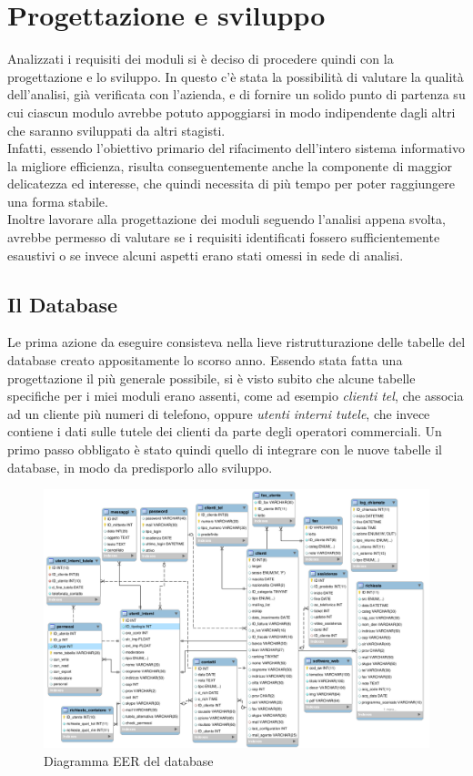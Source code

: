 \section{Progettazione e sviluppo}
Analizzati i requisiti dei moduli si \`e deciso di procedere quindi con la progettazione e lo sviluppo. In questo c'\`e stata la possibilit\`a di valutare la qualit\`a dell'analisi, gi\`a verificata con l'azienda, e di fornire un solido punto di partenza su cui ciascun modulo avrebbe potuto appoggiarsi in modo indipendente dagli altri che saranno sviluppati da altri stagisti. \\
Infatti, essendo l'obiettivo primario del rifacimento dell'intero sistema informativo la migliore efficienza, risulta conseguentemente anche la componente di maggior delicatezza ed interesse, che quindi necessita di pi\`u tempo per poter raggiungere una forma stabile. \\
Inoltre lavorare alla progettazione dei moduli seguendo l'analisi appena svolta, avrebbe permesso di valutare se i requisiti identificati fossero sufficientemente esaustivi o se invece alcuni aspetti erano stati omessi in sede di analisi.

\newpage
\subsection{Il Database}
Le prima azione da eseguire consisteva nella lieve ristrutturazione delle tabelle del database creato appositamente lo scorso anno. Essendo stata fatta una progettazione il pi\`u generale possibile, si \`e visto subito che alcune tabelle specifiche per i miei moduli erano assenti, come ad esempio \textit{clienti tel}, che associa ad un cliente pi\`u numeri di telefono, oppure \textit{utenti interni tutele}, che invece contiene i dati sulle tutele dei clienti da parte degli operatori commerciali. Un primo passo obbligato \`e stato quindi quello di integrare con le nuove tabelle il database, in modo da predisporlo allo sviluppo.

\begin{figure}[!ht]
\centering
  \includegraphics[scale=0.5]{./images/database.png}
\caption{Diagramma EER del database}
\label{EER}
\end{figure}

